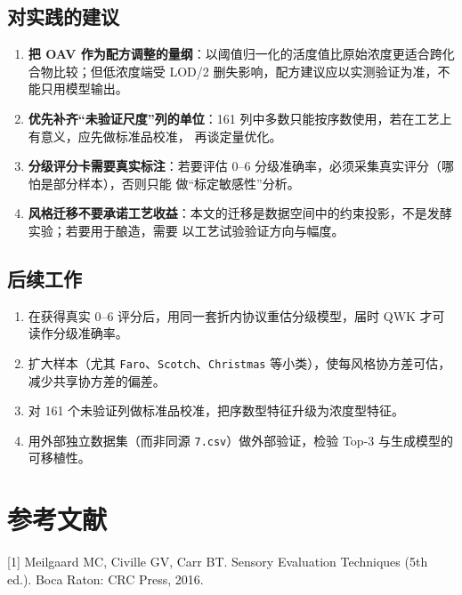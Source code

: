 \documentclass[
  a4paper,12pt]{article}
\providecommand{\tightlist}{%
  \setlength{\itemsep}{0pt}\setlength{\parskip}{0pt}}
\begin{document}
\subsection{对实践的建议}\label{ux5bf9ux5b9eux8df5ux7684ux5efaux8bae}

\begin{enumerate}
\def\labelenumi{\arabic{enumi}.}
\tightlist
\item
  \textbf{把 OAV
  作为配方调整的量纲}：以阈值归一化的活度值比原始浓度更适合跨化合物比较；但低浓度端受
  LOD/2 删失影响，配方建议应以实测验证为准，不能只用模型输出。
\item
  \textbf{优先补齐``未验证尺度''列的单位}：161
  列中多数只能按序数使用，若在工艺上有意义，应先做标准品校准，
  再谈定量优化。
\item
  \textbf{分级评分卡需要真实标注}：若要评估 0--6
  分级准确率，必须采集真实评分（哪怕是部分样本），否则只能
  做``标定敏感性''分析。
\item
  \textbf{风格迁移不要承诺工艺收益}：本文的迁移是数据空间中的约束投影，不是发酵实验；若要用于酿造，需要
  以工艺试验验证方向与幅度。
\end{enumerate}

\subsection{后续工作}\label{ux540eux7eedux5de5ux4f5c}

\begin{enumerate}
\def\labelenumi{\arabic{enumi}.}
\tightlist
\item
  在获得真实 0--6 评分后，用同一套折内协议重估分级模型，届时 QWK
  才可读作分级准确率。
\item
  扩大样本（尤其 \texttt{Faro}、\texttt{Scotch}、\texttt{Christmas}
  等小类），使每风格协方差可估，减少共享协方差的偏差。
\item
  对 161 个未验证列做标准品校准，把序数型特征升级为浓度型特征。
\item
  用外部独立数据集（而非同源 \texttt{7.csv}）做外部验证，检验 Top-3
  与生成模型的可移植性。
\end{enumerate}

\section*{参考文献}\label{ux53c2ux8003ux6587ux732e}

{[}1{]} Meilgaard MC, Civille GV, Carr BT. Sensory Evaluation Techniques
(5th ed.). Boca Raton: CRC Press, 2016.
\end{document}
